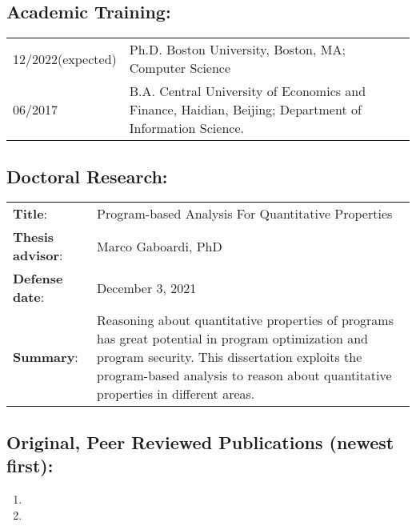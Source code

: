 \documentclass[12pt, letterpaper]{report}   %
\begin{document}
\subsection*{Academic Training:}
\begin{tabular}{p{}p{}}
12/2022\small(expected) &  Ph.D. Boston University, Boston, MA; Computer Science\\
06/2017  & B.A. Central University of Economics and Finance, Haidian, Beijing; Department of Information Science. \\
\end{tabular}

\subsection*{Doctoral Research:}
\begin{tabular}{p{}p{}}
\textbf{Title}: & Program-based Analysis For Quantitative Properties \\
\textbf{Thesis advisor}: & Marco Gaboardi, PhD\\
\textbf{Defense date}: & December 3, 2021 \\
\textbf{Summary}: & Reasoning about quantitative properties of programs has great potential in program optimization and program security. This dissertation exploits the program-based analysis to reason about quantitative properties in different areas.
\\
\end{tabular}

\subsection*{Original, Peer Reviewed Publications (newest first):}
\begin{enumerate}
\item 
\item 
\end{enumerate}
\end{document}
